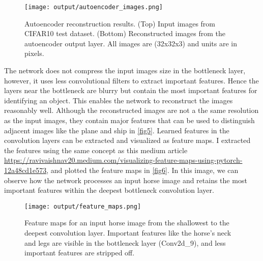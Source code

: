 \documentclass[12pt]{report}
\begin{document}
\begin{enumerate}
    \begin{figure}[H]
        \centering
        \texttt{[image: output/autoencoder\_images.png]}
        \caption{Autoencoder reconstruction results. (Top) Input images from CIFAR10 test dataset. (Bottom) Reconstructed images from the autoencoder output layer. All images are 
        (32x32x3) and units are in pixels.}
        \label{fig5}
    \end{figure}

    The network does not compress the input images size in the bottleneck layer, however, it uses less convolutional filters to extract important features. Hence the layers near 
    the bottleneck are blurry but contain the most important features for identifying an object. This enables the network to reconstruct the images reasonably well. Although the 
    reconstructed images are not a the same resolution as the input images, they contain major features that can be used to distinguish adjacent images like the plane and ship in 
    \autoref{fig5}. Learned features in the convolution layers can be extracted and visualized as feature maps. I extracted the features using the same concept as this medium 
    article \url{https://ravivaishnav20.medium.com/visualizing-feature-maps-using-pytorch-12a48cd1e573}, and plotted the feature maps in \autoref{fig6}. In this image, we can 
    observe how the network processes an input horse image and retains the most important features within the deepest bottleneck convolution layer. 

    \begin{figure}[H]
        \centering
        \texttt{[image: output/feature\_maps.png]}
        \caption{Feature maps for an input horse image from the shallowest to the deepest convolution layer. Important features like the horse's neck and legs are visible in 
        the bottleneck layer (Conv2d\_9), and less important features are stripped off.}
        \label{fig6}
    \end{figure}

\end{enumerate}

\printbibliography %
\end{document}
